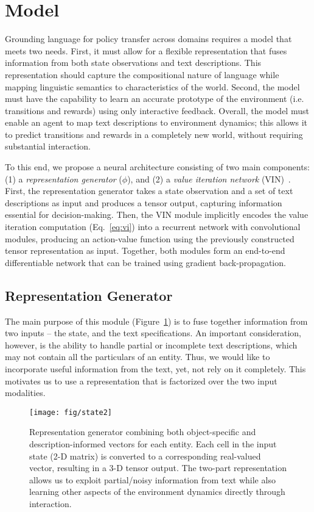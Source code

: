 \section{Model}
\label{sec:model}

Grounding language for policy transfer across domains requires a model that meets two needs. First, it must allow for a flexible representation that fuses information from both state observations and text descriptions. This representation should capture the compositional nature of language while mapping linguistic semantics to characteristics of the world. Second, the model must have the capability to learn an accurate prototype  of the environment (i.e. transitions and rewards) using only interactive feedback. Overall, the model must enable an agent to map text descriptions to environment dynamics; this allows it to predict transitions and rewards in a completely new world, without requiring substantial interaction.

To this end, we propose a neural architecture consisting of two main components: (1) a \emph{representation generator} ($\phi$), and (2) a \emph{value iteration network} (VIN)~\cite{tamar2016value}. First, the representation generator takes a state observation and a set of text descriptions as input and produces a tensor output, capturing  information essential for decision-making. Then, the VIN module implicitly encodes the value iteration computation (Eq.~\ref{eq:vi}) into a recurrent network with convolutional modules, producing an action-value function using the previously constructed tensor representation as input. Together, both modules form an end-to-end differentiable network that can be trained using gradient back-propagation.  
 
\subsection{Representation Generator}

The main purpose of this module (Figure~\ref{fig:transfer-state}) is to fuse together information from two inputs -- the state, and the text specifications. An important consideration, however, is the ability to handle partial or incomplete text descriptions, which may not contain all the particulars of an entity. Thus, we would like to incorporate useful information from the text, yet, not rely on it completely. This motivates us to use a representation that is factorized over the two input modalities.

\begin{figure}[t]
\centering
 \texttt{[image: fig/state2]}
\caption{Representation generator combining both object-specific and description-informed vectors for each entity. Each cell in the input state (2-D matrix) is converted to a corresponding real-valued vector, resulting in a 3-D tensor output. The two-part representation allows us to exploit partial/noisy information from text while also learning other aspects of the environment dynamics directly through interaction.} 
	\label{fig:transfer-state}
\end{figure}

